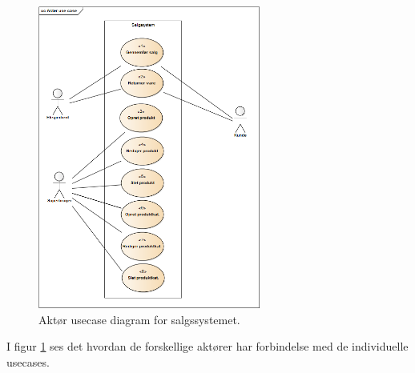 \begin{figure}[htb]
    \centering
    \includegraphics[width=0.65\textwidth]{Kravspecifikation/Billeder/AktorUC.PNG}
    \caption{Aktør usecase diagram for salgssystemet.}
    \label{fig:aktcont}
\end{figure}

I figur \ref{fig:aktcont} ses det hvordan de forskellige aktører har forbindelse med de individuelle usecases.